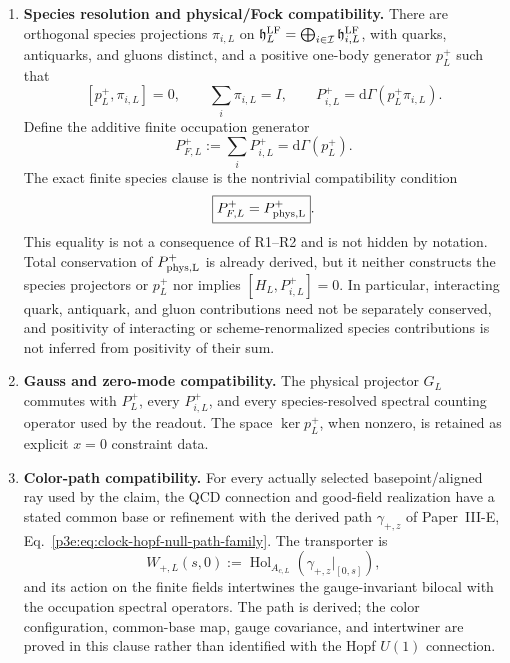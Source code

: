\documentclass[12pt,a4paper]{article}
\begin{document}
\begin{definition}
\begin{enumerate}[label=\textnormal{(R\arabic*)},leftmargin=2.8em]
\item \textbf{Species resolution and physical/Fock compatibility.}
There are orthogonal species projections
\(\pi_{i,L}\) on
\(\mathfrak h_L^{\rm LF}=\bigoplus_{i\in\mathcal I}
\mathfrak h_{i,L}^{\rm LF}\), with quarks, antiquarks, and gluons distinct,
and a positive one-body generator \(p_L^+\) such that
\[
 [p_L^+,\pi_{i,L}]=0,
 \qquad \sum_i\pi_{i,L}=I,
 \qquad
 P_{i,L}^+=\mathrm d\Gamma(p_L^+\pi_{i,L}).
\]
Define the additive finite occupation generator
\begin{equation}
\label{p10:eq:v252-fock-plus-generator}
 P_{F,L}^+:=\sum_iP_{i,L}^+=\mathrm d\Gamma(p_L^+).
\end{equation}
The exact finite species clause is the nontrivial compatibility condition
\begin{equation}
\label{p10:eq:v252-r3-fock-physical-equality}
 \boxed{P_{F,L}^+=P_{\rm phys,L}^+}.
\end{equation}
This equality is not a consequence of R1--R2 and is not hidden by notation.
Total conservation of \(P_{\rm phys,L}^+\) is already derived, but it neither
constructs the species projectors or \(p_L^+\) nor implies
\([H_L,P_{i,L}^+]=0\).  In particular, interacting quark, antiquark, and gluon
contributions need not be separately conserved, and positivity of interacting
or scheme-renormalized species contributions is not inferred from positivity
of their sum.

\item \textbf{Gauss and zero-mode compatibility.}
The physical projector \(G_L\) commutes with \(P_L^+\), every
\(P_{i,L}^+\), and every species-resolved spectral counting operator used by
the readout.  The space \(\ker p_L^+\), when nonzero, is retained as explicit
\(x=0\) constraint data.

\item \textbf{Color-path compatibility.}
For every actually selected basepoint/aligned ray used by the claim, the QCD
connection and good-field realization have a stated common base or refinement
with the derived path \(\gamma_{+,z}\) of
Paper~III-E, Eq.~\eqref{p3e:eq:clock-hopf-null-path-family}.  The transporter
is
\begin{equation}
\label{p10:eq:derived-path-color-holonomy}
 W_{+,L}(s,0)
 :=\operatorname{Hol}_{A_{c,L}}
       (\gamma_{+,z}|_{[0,s]}),
\end{equation}
and its action on the finite fields intertwines the gauge-invariant bilocal
with the occupation spectral operators.  The path is derived; the color
configuration, common-base map, gauge covariance, and intertwiner are proved
in this clause rather than identified with the Hopf \(U(1)\) connection.


\end{enumerate}
\end{definition}
\end{document}
